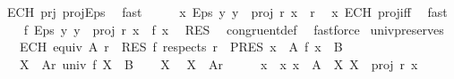\begin{isabellebody}
\ ECH\ prj\ proj{\isacharunderscore}{\kern0pt}Eps\ \isamarkupfalse%
\ fast\isanewline
\ \ \isamarkupfalse%
\ \isamarkupfalse%
\ {\isachardoublequoteopen}{\isacharparenleft}{\kern0pt}x{\isacharcomma}{\kern0pt}\ Eps\ {\isacharparenleft}{\kern0pt}{\isasymlambda}y{\isachardot}{\kern0pt}\ y\ {\isasymin}\ proj\ r\ x{\isacharparenright}{\kern0pt}{\isacharparenright}{\kern0pt}\ {\isasymin}\ r{\isachardoublequoteclose}\ \isamarkupfalse%
\ x\ ECH\ proj{\isacharunderscore}{\kern0pt}iff\ \isamarkupfalse%
\ fast\isanewline
\ \ \isamarkupfalse%
\ {\isachardoublequoteopen}f\ {\isacharparenleft}{\kern0pt}Eps\ {\isacharparenleft}{\kern0pt}{\isasymlambda}y{\isachardot}{\kern0pt}\ y\ {\isasymin}\ proj\ r\ x{\isacharparenright}{\kern0pt}{\isacharparenright}{\kern0pt}\ {\isacharequal}{\kern0pt}\ f\ x{\isachardoublequoteclose}\ \isamarkupfalse%
\ RES\ \isamarkupfalse%
\ congruent{\isacharunderscore}{\kern0pt}def\ \isamarkupfalse%
\ fastforce\isanewline
{}\isamarkupfalse%
%
\endisatagproof
{\isafoldproof}%
%
\isadelimproof
\isanewline
%
\endisadelimproof
\isanewline
{}\isamarkupfalse%
\ univ{\isacharunderscore}{\kern0pt}preserves{\isacharcolon}{\kern0pt}\isanewline
\ \ \ ECH{\isacharcolon}{\kern0pt}\ {\isachardoublequoteopen}equiv\ A\ r{\isachardoublequoteclose}\ \ RES{\isacharcolon}{\kern0pt}\ {\isachardoublequoteopen}f\ respects\ r{\isachardoublequoteclose}\ \ PRES{\isacharcolon}{\kern0pt}\ {\isachardoublequoteopen}{\isasymforall}x\ {\isasymin}\ A{\isachardot}{\kern0pt}\ f\ x\ {\isasymin}\ B{\isachardoublequoteclose}\isanewline
\ \ \ {\isachardoublequoteopen}{\isasymforall}X\ {\isasymin}\ A{\isacharslash}{\kern0pt}{\isacharslash}{\kern0pt}r{\isachardot}{\kern0pt}\ univ\ f\ X\ {\isasymin}\ B{\isachardoublequoteclose}\isanewline
%
\isadelimproof
%
\endisadelimproof
%
\isatagproof
{}\isamarkupfalse%
\isanewline
\ \ \isamarkupfalse%
\ X\ \isamarkupfalse%
\ {\isachardoublequoteopen}X\ {\isasymin}\ A{\isacharslash}{\kern0pt}{\isacharslash}{\kern0pt}r{\isachardoublequoteclose}\isanewline
\ \ \isamarkupfalse%
\ \isamarkupfalse%
\ x\ \ x{\isacharcolon}{\kern0pt}\ {\isachardoublequoteopen}x\ {\isasymin}\ A{\isachardoublequoteclose}\ \ X{\isacharcolon}{\kern0pt}\ {\isachardoublequoteopen}X\ {\isacharequal}{\kern0pt}\ proj\ r\ x{\isachardoublequoteclose}\ \isamarkupfalse%

\end{isabellebody}
